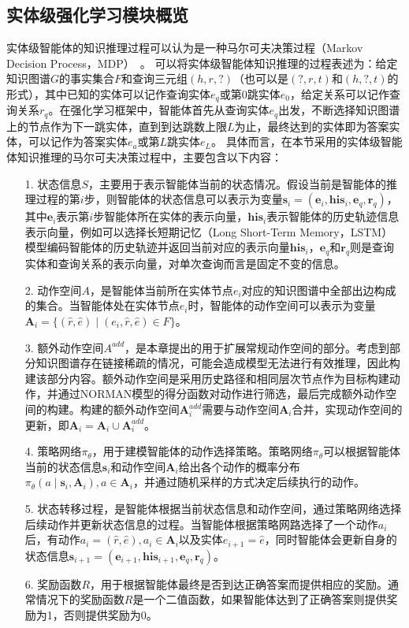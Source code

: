 \documentclass[algorithmlist, AutoFakeBold, AutoFakeSlant, figurelist, tablelist, nomlist, engineering]{seuthesix}
\begin{document}
\subsection{实体级强化学习模块概览}
实体级智能体的知识推理过程可以认为是一种马尔可夫决策过程（Markov Decision Process，MDP）~\cite{gronauer2022multi}。
可以将实体级智能体知识推理的过程表述为：给定知识图谱$G$的事实集合$F$和查询三元组$(h, r, ?)$（也可以是$(?, r, t)$和$(h, ?, t)$的形式），其中已知的实体可以记作查询实体$e_q$或第0跳实体$e_0$，给定关系可以记作查询关系$r_q$。在强化学习框架中，智能体首先从查询实体$e_q$出发，不断选择知识图谱上的节点作为下一跳实体，直到到达跳数上限$L$为止，最终达到的实体即为答案实体，可以记作为答案实体$e_a$或第$L$跳实体$e_L$。
具体而言，在本节采用的实体级智能体知识推理的马尔可夫决策过程中，主要包含以下内容：
\begin{itemize}
  \item [1.] 状态信息$S$，主要用于表示智能体当前的状态情况。假设当前是智能体的推理过程的第$i$步，则智能体的状态信息可以表示为变量$\bm{s}_i = (\bm{e}_i, \bm{his}_i, \bm{e}_q, \bm{r}_q)$，其中$\bm{e}_i$表示第$i$步智能体所在实体的表示向量，$\bm{his}_i$表示智能体的历史轨迹信息表示向量，例如可以选择长短期记忆（Long Short-Term Memory，LSTM）模型编码智能体的历史轨迹并返回当前对应的表示向量$\bm{his}_i$，$\bm{e}_q$和$\bm{r}_q$则是查询实体和查询关系的表示向量，对单次查询而言是固定不变的信息。
  \item [2.] 动作空间$A$，是智能体当前所在实体节点$e_i$对应的知识图谱中全部出边构成的集合。当智能体处在实体节点$e_i$时，智能体的动作空间可以表示为变量$\bm{A}_i = \{(\hat{r}, \hat{e}) \mid (e_i, \hat{r}, \hat{e}) \in F\}$。
  \item [3.] 额外动作空间$A^{add}$，是本章提出的用于扩展常规动作空间的部分。考虑到部分知识图谱存在链接稀疏的情况，可能会造成模型无法进行有效推理，因此构建该部分内容。额外动作空间是采用历史路径和相同层次节点作为目标构建动作，并通过NORMAN模型的得分函数对动作进行筛选，最后完成额外动作空间的构建。构建的额外动作空间$\bm{A}_{i}^{add}$需要与动作空间$\bm{A}_i$合并，实现动作空间的更新，即$\bm{A}_i = \bm{A}_i \cup \bm{A}_{i}^{add}$。
  \item [4.] 策略网络$\pi_\theta$，用于建模智能体的动作选择策略。策略网络$\pi_\theta$可以根据智能体当前的状态信息$\bm{s}_i$和动作空间$\bm{A}_i$给出各个动作的概率分布$\pi_\theta(a \mid \bm{s}_i, \bm{A}_i), a \in \bm{A}_i$，并通过随机采样的方式决定后续执行的动作。
  \item [5.] 状态转移过程，是智能体根据当前状态信息和动作空间，通过策略网络选择后续动作并更新状态信息的过程。当智能体根据策略网路选择了一个动作$a_i$后，有动作$a_i = (\hat{r}, \hat{e}), a_i \in \bm{A}_i$以及实体$e_{i+1}=\hat{e}$，同时智能体会更新自身的状态信息$\bm{s}_{i+1} = (\bm{e}_{i+1}, \bm{his}_{i+1}, \bm{e}_q, \bm{r}_q)$。
  \item [6.] 奖励函数$R$，用于根据智能体最终是否到达正确答案而提供相应的奖励。通常情况下的奖励函数$R$是一个二值函数，如果智能体达到了正确答案则提供奖励为1，否则提供奖励为0。
\end{itemize}
\end{document}
